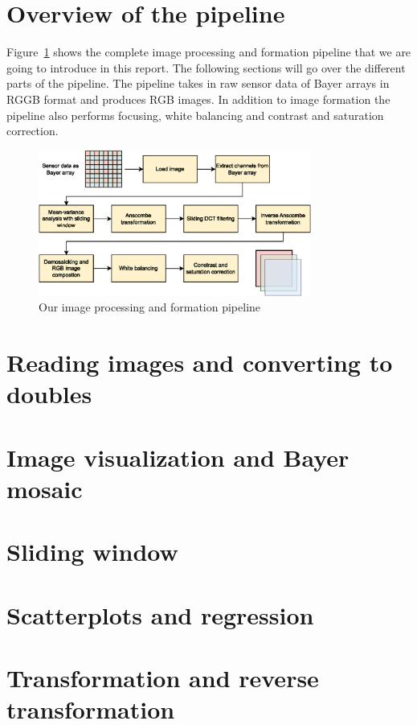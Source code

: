 \documentclass[12pt,a4paper,english
]{tunithesis}
\begin{document}
\section{Overview of the pipeline}
Figure~\ref{fig:pipeline} shows the complete image processing and formation pipeline that we are going to introduce in this report. The following sections will go over the different parts of the pipeline. The pipeline takes in raw sensor data of Bayer arrays in RGGB format and produces RGB images. In addition to image formation the pipeline also performs focusing, white balancing and contrast and saturation correction.

\begin{figure}
  \centering
  \includegraphics[width=0.8\textwidth]{img/image_pipeline.eps}
  \caption{Our image processing and formation pipeline}
  \label{fig:pipeline}
\end{figure}

\section{Reading images and converting to doubles}

\section{Image visualization and Bayer mosaic}

\section{Sliding window}

\section{Scatterplots and regression}

\section{Transformation and reverse transformation}
\end{document}
